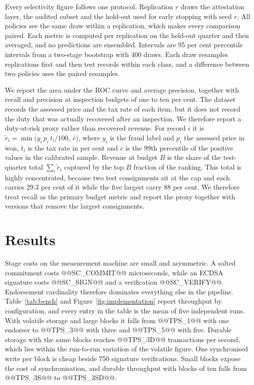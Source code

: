 \documentclass[information,article,submit,moreauthors]{Definitions/mdpi}
\begin{document}
Every selectivity figure follows one protocol. Replication $r$ draws the attestation layer, the audited subset and the hold-out used for early stopping with seed $r$. All policies see the same draw within a replication, which makes every comparison paired. Each metric is computed per replication on the held-out quarter and then averaged, and no predictions are ensembled. Intervals are 95 per cent percentile intervals from a two-stage bootstrap with 400 draws. Each draw resamples replications first and then test records within each class, and a difference between two policies uses the paired resamples.

We report the area under the ROC curve and average precision, together with recall and precision at inspection budgets of one to ten per cent. The dataset records the assessed price and the tax rate of each item, but it does not record the duty that was actually recovered after an inspection. We therefore report a duty-at-risk proxy rather than recovered revenue. For record $i$ it is $\tilde r_i = \min\!\big(y_i \, p_i \, t_i / 100,\ \bar c\big)$, where $y_i$ is the fraud label and $p_i$ the assessed price in won, $t_i$ is the tax rate in per cent and $\bar c$ is the 99th percentile of the positive values in the calibrated sample. Revenue at budget $B$ is the share of the test-quarter total $\sum_i \tilde r_i$ captured by the top $B$ fraction of the ranking. This total is highly concentrated, because two test consignments sit at the cap and each carries 29.3 per cent of it while the five largest carry 88 per cent. We therefore treat recall as the primary budget metric and report the proxy together with versions that remove the largest consignments.

\section{Results}\label{sec:results}

Stage costs on the measurement machine are small and asymmetric. A salted commitment costs @@SC_COMMIT@@ microseconds, while an ECDSA signature costs @@SC_SIGN@@ and a verification @@SC_VERIFY@@. Endorsement cardinality therefore dominates everything else in the pipeline. Table~\ref{tab:bench} and Figure~\ref{fig:implementation} report throughput by configuration, and every entry in the table is the mean of five independent runs. With volatile storage and large blocks it falls from @@TPS_1@@ with one endorser to @@TPS_3@@ with three and @@TPS_5@@ with five. Durable storage with the same blocks reaches @@TPS_3D@@ transactions per second, which lies within the run-to-run variation of the volatile figure. One synchronised write per block is cheap beside 750 signature verifications. Small blocks expose the cost of synchronisation, and durable throughput with blocks of ten falls from @@TPS_3S@@ to @@TPS_3SD@@.
\end{document}
